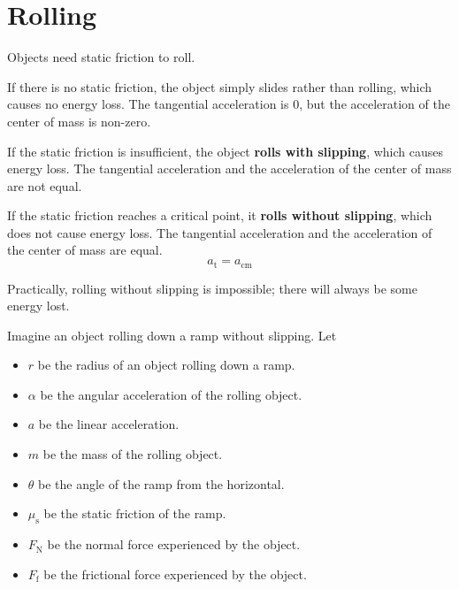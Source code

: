 \documentclass[a4paper, titlepage]{book}
\begin{document}
\section{Rolling}

Objects need static friction to roll.

If there is no static friction, the object simply slides rather than rolling,
which causes no energy loss.
The tangential acceleration is 0,
but the acceleration of the center of mass is non-zero.

If the static friction is insufficient, the object \textbf{rolls with slipping},
which causes energy loss.
The tangential acceleration and the acceleration of the center of mass are not equal.

If the static friction reaches a critical point, it \textbf{rolls without slipping},
which does not cause energy loss.
The tangential acceleration and the acceleration of the center of mass are equal.
\begin{equation}
    a_\mathrm{t} = a_\mathrm{cm}
\end{equation}

Practically, rolling without slipping is impossible;
there will always be some energy lost.

Imagine an object rolling down a ramp without slipping.
Let
\begin{itemize}
    \item \(r\) be the radius of an object rolling down a ramp.
    \item \(\alpha\) be the angular acceleration of the rolling object.
    \item \(a\) be the linear acceleration.
    \item \(m\) be the mass of the rolling object.
    \item \(\theta\) be the angle of the ramp from the horizontal.
    \item \(\mu_\mathrm{s}\) be the static friction of the ramp.
    \item \(F_\mathrm{N}\) be the normal force experienced by the object.
    \item \(F_\mathrm{f}\) be the frictional force experienced by the object.
\end{itemize}
\end{document}
